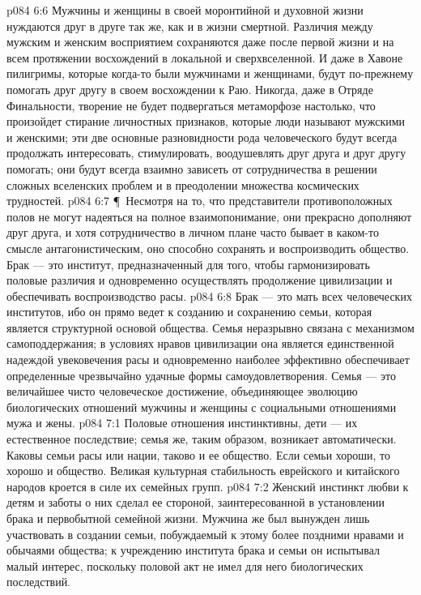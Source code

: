 \vs p084 6:6 Мужчины и женщины в своей моронтийной и духовной жизни нуждаются друг в друге так же, как и в жизни смертной. Различия между мужским и женским восприятием сохраняются даже после первой жизни и на всем протяжении восхождений в локальной и сверхвселенной. И даже в Хавоне пилигримы, которые когда\hyp{}то были мужчинами и женщинами, будут по\hyp{}прежнему помогать друг другу в своем восхождении к Раю. Никогда, даже в Отряде Финальности, творение не будет подвергаться метаморфозе настолько, что произойдет стирание личностных признаков, которые люди называют мужскими и женскими; эти две основные разновидности рода человеческого будут всегда продолжать интересовать, стимулировать, воодушевлять друг друга и друг другу помогать; они будут всегда взаимно зависеть от сотрудничества в решении сложных вселенских проблем и в преодолении множества космических трудностей.
\vs p084 6:7 \P\ Несмотря на то, что представители противоположных полов не могут надеяться на полное взаимопонимание, они прекрасно дополняют друг друга, и хотя сотрудничество в личном плане часто бывает в каком\hyp{}то смысле антагонистическим, оно способно сохранять и воспроизводить общество. Брак --- это институт, предназначенный для того, чтобы гармонизировать половые различия и одновременно осуществлять продолжение цивилизации и обеспечивать воспроизводство расы.
\vs p084 6:8 Брак --- это мать всех человеческих институтов, ибо он прямо ведет к созданию и сохранению семьи, которая является структурной основой общества. Семья неразрывно связана с механизмом самоподдержания; в условиях нравов цивилизации она является единственной надеждой увековечения расы и одновременно наиболее эффективно обеспечивает определенные чрезвычайно удачные формы самоудовлетворения. Семья --- это величайшее чисто человеческое достижение, объединяющее эволюцию биологических отношений мужчины и женщины с социальными отношениями мужа и жены.
\vs p084 7:1 Половые отношения инстинктивны, дети --- их естественное последствие; семья же, таким образом, возникает автоматически. Каковы семьи расы или нации, таково и ее общество. Если семьи хороши, то хорошо и общество. Великая культурная стабильность еврейского и китайского народов кроется в силе их семейных групп.
\vs p084 7:2 Женский инстинкт любви к детям и заботы о них сделал ее стороной, заинтересованной в установлении брака и первобытной семейной жизни. Мужчина же был вынужден лишь участвовать в создании семьи, побуждаемый к этому более поздними нравами и обычаями общества; к учреждению института брака и семьи он испытывал малый интерес, поскольку половой акт не имел для него биологических последствий.
